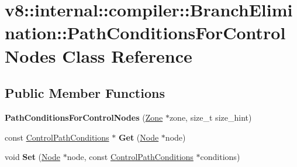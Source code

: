 \hypertarget{classv8_1_1internal_1_1compiler_1_1_branch_elimination_1_1_path_conditions_for_control_nodes}{}\section{v8\+:\+:internal\+:\+:compiler\+:\+:Branch\+Elimination\+:\+:Path\+Conditions\+For\+Control\+Nodes Class Reference}
\label{classv8_1_1internal_1_1compiler_1_1_branch_elimination_1_1_path_conditions_for_control_nodes}
\subsection*{Public Member Functions}
\begin{DoxyCompactItemize}
\item 
{\bfseries Path\+Conditions\+For\+Control\+Nodes} (\hyperlink{classv8_1_1internal_1_1_zone}{Zone} $\ast$zone, size\+\_\+t size\+\_\+hint)\hypertarget{classv8_1_1internal_1_1compiler_1_1_branch_elimination_1_1_path_conditions_for_control_nodes_abd84160d45412e7ed770ca9ee12f4b8d}{}\label{classv8_1_1internal_1_1compiler_1_1_branch_elimination_1_1_path_conditions_for_control_nodes_abd84160d45412e7ed770ca9ee12f4b8d}

\item 
const \hyperlink{classv8_1_1internal_1_1compiler_1_1_branch_elimination_1_1_control_path_conditions}{Control\+Path\+Conditions} $\ast$ {\bfseries Get} (\hyperlink{classv8_1_1internal_1_1compiler_1_1_node}{Node} $\ast$node)\hypertarget{classv8_1_1internal_1_1compiler_1_1_branch_elimination_1_1_path_conditions_for_control_nodes_a8e954144bd2f6ba63e05bcb2bfdd1499}{}\label{classv8_1_1internal_1_1compiler_1_1_branch_elimination_1_1_path_conditions_for_control_nodes_a8e954144bd2f6ba63e05bcb2bfdd1499}

\item 
void {\bfseries Set} (\hyperlink{classv8_1_1internal_1_1compiler_1_1_node}{Node} $\ast$node, const \hyperlink{classv8_1_1internal_1_1compiler_1_1_branch_elimination_1_1_control_path_conditions}{Control\+Path\+Conditions} $\ast$conditions)\hypertarget{classv8_1_1internal_1_1compiler_1_1_branch_elimination_1_1_path_conditions_for_control_nodes_a57da57d47d0ecbd3728db567d7cb5d60}{}\label{classv8_1_1internal_1_1compiler_1_1_branch_elimination_1_1_path_conditions_for_control_nodes_a57da57d47d0ecbd3728db567d7cb5d60}

\end{DoxyCompactItemize}
